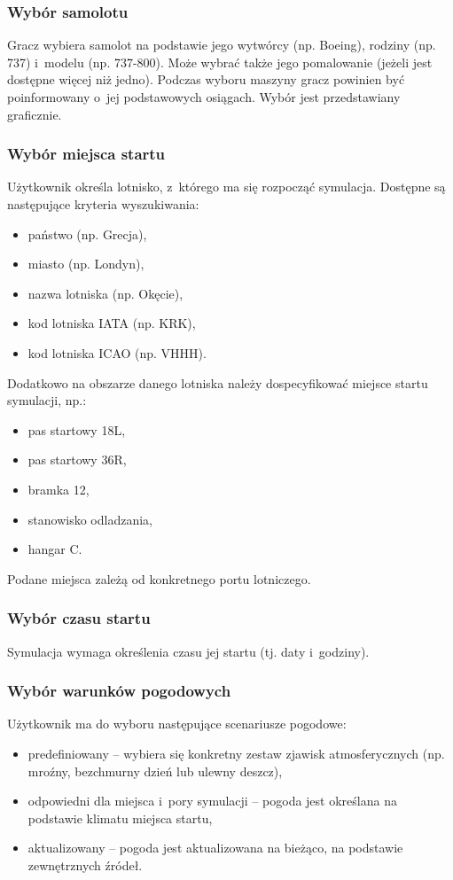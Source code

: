 \documentclass{mwrep}
\begin{document}
\subsubsection{Wybór samolotu}
Gracz wybiera samolot na podstawie jego wytwórcy (np. Boeing), rodziny (np. 737) i~modelu (np. 737-800). Może wybrać także jego pomalowanie (jeżeli jest dostępne więcej niż jedno). Podczas wyboru maszyny gracz powinien być poinformowany o~jej podstawowych osiągach. Wybór jest przedstawiany graficznie.

\subsubsection{Wybór miejsca startu}
Użytkownik określa lotnisko, z~którego ma się rozpocząć symulacja. Dostępne są następujące kryteria wyszukiwania:
\begin{itemize}
\item państwo (np. Grecja),
\item miasto (np. Londyn),
\item nazwa lotniska (np. Okęcie),
\item kod lotniska IATA (np. KRK),
\item kod lotniska ICAO (np. VHHH).
\end{itemize}
Dodatkowo na obszarze danego lotniska należy dospecyfikować miejsce startu symulacji, np.:
\begin{itemize}
\item pas startowy 18L,
\item pas startowy 36R,
\item bramka 12,
\item stanowisko odladzania,
\item hangar C.
\end{itemize}
Podane miejsca zależą od konkretnego portu lotniczego.

\subsubsection{Wybór czasu startu}
Symulacja wymaga określenia czasu jej startu (tj. daty i~godziny).

\subsubsection{Wybór warunków pogodowych}
Użytkownik ma do wyboru następujące scenariusze pogodowe:
\begin{itemize}
\item predefiniowany -- wybiera się konkretny zestaw zjawisk atmosferycznych (np. mroźny, bezchmurny dzień lub ulewny deszcz),
\item odpowiedni dla miejsca i~pory symulacji -- pogoda jest określana na podstawie klimatu miejsca startu,
\item aktualizowany -- pogoda jest aktualizowana na bieżąco, na podstawie zewnętrznych źródeł.
\end{itemize}
\end{document}
